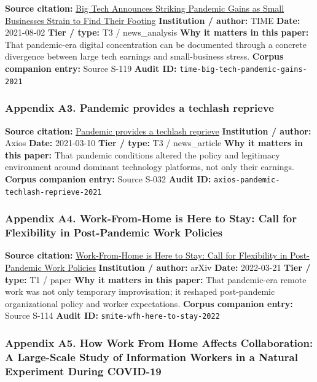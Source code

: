 \documentclass[
  american,
  11pt,
  letterpaper,
]{article}
\begin{document}
\textbf{Source citation:}
\href{https://time.com/6085674/big-tech-apple-microsoft-facebook-amazon-google-earnings/}{Big
Tech Announces Striking Pandemic Gains as Small Businesses Strain to
Find Their Footing} \textbf{Institution / author:} TIME \textbf{Date:}
2021-08-02 \textbf{Tier / type:} T3 / news\_analysis \textbf{Why it
matters in this paper:} That pandemic-era digital concentration can be
documented through a concrete divergence between large tech earnings and
small-business stress. \textbf{Corpus companion entry:} Source S-119
\textbf{Audit ID:} \texttt{time-big-tech-pandemic-gains-2021}

\subsubsection{Appendix A3. Pandemic provides a techlash
reprieve}\label{ch-03-appendix-a3-pandemic-provides-a-techlash-reprieve}

\textbf{Source citation:}
\href{https://www.axios.com/2021/03/10/pandemic-provides-techlash-reprieve}{Pandemic
provides a techlash reprieve} \textbf{Institution / author:} Axios
\textbf{Date:} 2021-03-10 \textbf{Tier / type:} T3 / news\_article
\textbf{Why it matters in this paper:} That pandemic conditions altered
the policy and legitimacy environment around dominant technology
platforms, not only their earnings. \textbf{Corpus companion entry:}
Source S-032 \textbf{Audit ID:}
\texttt{axios-pandemic-techlash-reprieve-2021}

\subsubsection{Appendix A4. Work-From-Home is Here to Stay: Call for
Flexibility in Post-Pandemic Work
Policies}\label{ch-03-appendix-a4-work-from-home-is-here-to-stay-call-for-flexibility-in-post-pandemic-work-policies}

\textbf{Source citation:}
\href{https://arxiv.org/abs/2203.11136}{Work-From-Home is Here to Stay:
Call for Flexibility in Post-Pandemic Work Policies} \textbf{Institution
/ author:} arXiv \textbf{Date:} 2022-03-21 \textbf{Tier / type:} T1 /
paper \textbf{Why it matters in this paper:} That pandemic-era remote
work was not only temporary improvisation; it reshaped post-pandemic
organizational policy and worker expectations. \textbf{Corpus companion
entry:} Source S-114 \textbf{Audit ID:}
\texttt{smite-wfh-here-to-stay-2022}

\subsubsection{Appendix A5. How Work From Home Affects Collaboration: A
Large-Scale Study of Information Workers in a Natural Experiment During
COVID-19}\label{ch-03-appendix-a5-how-work-from-home-affects-collaboration-a-large-scale-study-of-information-workers-in-a-natural-experiment-during-covid-19}
\end{document}
